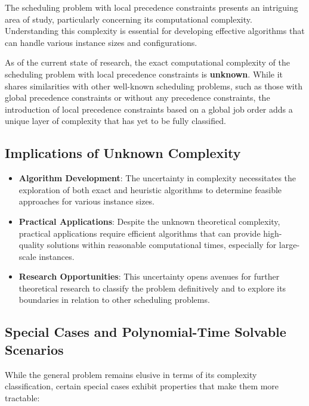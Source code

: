 The scheduling problem with local precedence constraints presents an intriguing area of study, particularly concerning its computational complexity. Understanding this complexity is essential for developing effective algorithms that can handle various instance sizes and configurations.

As of the current state of research, the exact computational complexity of the scheduling problem with local precedence constraints is \textbf{unknown}. While it shares similarities with other well-known scheduling problems, such as those with global precedence constraints or without any precedence constraints, the introduction of local precedence constraints based on a global job order adds a unique layer of complexity that has yet to be fully classified.

\subsection*{Implications of Unknown Complexity}

\begin{itemize}
    \item \textbf{Algorithm Development}: The uncertainty in complexity necessitates the exploration of both exact and heuristic algorithms to determine feasible approaches for various instance sizes.

    \item \textbf{Practical Applications}: Despite the unknown theoretical complexity, practical applications require efficient algorithms that can provide high-quality solutions within reasonable computational times, especially for large-scale instances.

    \item \textbf{Research Opportunities}: This uncertainty opens avenues for further theoretical research to classify the problem definitively and to explore its boundaries in relation to other scheduling problems.
\end{itemize}

\subsection*{Special Cases and Polynomial-Time Solvable Scenarios}

While the general problem remains elusive in terms of its complexity classification, certain special cases exhibit properties that make them more tractable:

